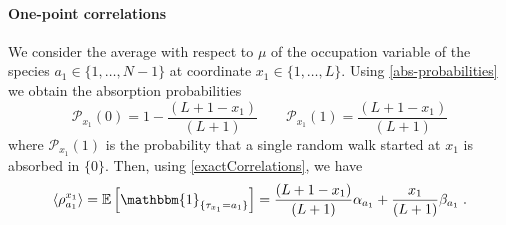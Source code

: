 \documentclass[10pt]{article}
\numberwithin{equation}{section}
\numberwithin{equation}{subsection}
\newcommand{\dt}{\;.}
\begin{document}
\paragraph{One-point correlations}
We consider the average with respect to $\mu$ of the occupation variable of the species $a_{1}\in \{1,\ldots,N-1\}$ at coordinate $x_{1}\in \{1,\ldots,L\}$. %
Using \eqref{abs-probabilities} we obtain the absorption probabilities 
\begin{equation}
	\mathcal{P}_{x_1}(0)=1-\frac{(L+1-x_{1})}{(L+1)}\qquad \mathcal{P}_{x_1}(1)=\frac{(L+1-x_{1})}{(L+1)}
\end{equation} 
where $\mathcal{P}_{x_1}(1)$ is the probability that a single random walk started at $x_1$ is absorbed in $\{0\}$. Then, using \eqref{exactCorrelations}, we have
\begin{equation}\label{one-pts-corr}
		\langle\rho_{a_{1}}^{x_{1}}\rangle= \mathbb{E}\left[\mathbbm{1}_{\{\tau_{x_{1}}=a_{1}\}}\right]=\frac{(L+1-x_{1})}{(L+1)}\alpha_{a_{1}}+\frac{x_{1}}{(L+1)}\beta_{a_{1}}\dt
\end{equation}
\end{document}
